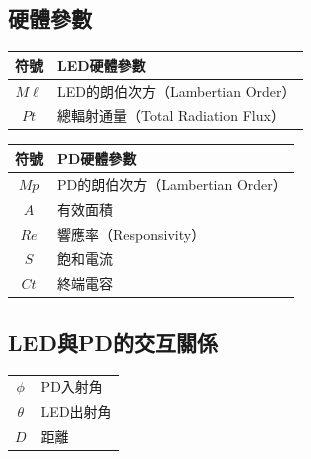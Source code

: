 

\onehalfspacing

\subsection*{硬體參數}

\begin{longtable}[l]{cl}
    符號 & LED硬體參數\\ \hline
    $M\ell$ & LED的朗伯次方（Lambertian Order）\\
    $Pt$ & 總輻射通量（Total Radiation Flux） 
\end{longtable}

\begin{longtable}[l]{cl}
    符號 & PD硬體參數\\ \hline
    $Mp$ & PD的朗伯次方（Lambertian Order）\\
    $A$ & 有效面積\\
    $Re$ & 響應率（Responsivity）\\
    $S$ &飽和電流\\
    $Ct$&終端電容\\
\end{longtable}


\onehalfspacing

\subsection*{LED與PD的交互關係}

\begin{longtable}[l]{cl}
    $\phi$ & PD入射角\\
    $\theta$ & LED出射角\\
    $D$&距離\\
\end{longtable}


